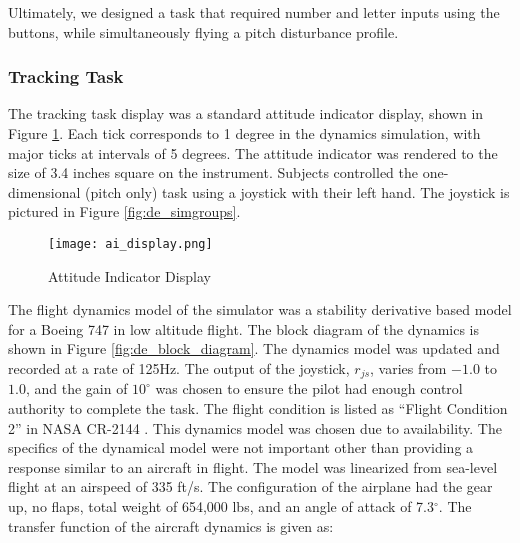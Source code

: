 Ultimately, we designed a task that required number and letter inputs using the buttons, while simultaneously flying a pitch disturbance profile.

\subsubsection{Tracking Task}
\label{sec:de_fdm}

The tracking task display was a standard attitude indicator display, shown in Figure \ref{fig:de_ai_display}.
Each tick corresponds to 1 degree in the dynamics simulation, with major ticks at intervals of 5 degrees.
The attitude indicator was rendered to the size of 3.4 inches square on the instrument.
Subjects controlled the one-dimensional (pitch only) task using a joystick with their left hand.
The joystick is pictured in Figure \ref{fig:de_simgroups}.

\begin{figure}
    \centering
    \texttt{[image: ai\_display.png]}
    \caption{Attitude Indicator Display}
    \label{fig:de_ai_display}
\end{figure}

The flight dynamics model of the simulator was a stability derivative based model for a Boeing 747 in low altitude flight.
The block diagram of the dynamics is shown in Figure \ref{fig:de_block_diagram}.
The dynamics model was updated and recorded at a rate of 125Hz.
The output of the joystick, $r_{js}$, varies from $-1.0$ to $1.0$, and the gain of $10^{\circ}$ was chosen to ensure the pilot had enough control authority to complete the task.
The flight condition is listed as ``Flight Condition 2'' in NASA CR-2144 \citep{heffley_aircraft_1972}.
This dynamics model was chosen due to availability.
The specifics of the dynamical model were not important other than providing a response similar to an aircraft in flight.
The model was linearized from sea-level flight at an airspeed of 335 ft/s.
The configuration of the airplane had the gear up, no flaps, total weight of 654,000 lbs, and an angle of attack of 7.3$^{\circ}$.
The transfer function of the aircraft dynamics is given as:

